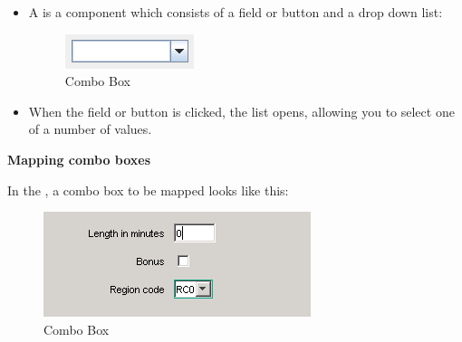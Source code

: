 \begin{itemize}
\item A  is a component which consists of a field or button and a drop down list:

\begin{figure}
\begin{center}
\includegraphics{PS/Combobox}
\caption{Combo Box}
\label{Combobox}
\end{center}
\end{figure}


  \item When the field or button is clicked, the list opens, allowing you to select one of a number of values.
\end{itemize}

\textbf{Mapping combo boxes}

In the \gdomm{}, a combo box to be mapped looks like this:

\begin{figure}
\begin{center}
\includegraphics{PS/Mapcombobox}
\caption{Combo Box}
\label{mapcombobox}
\end{center}
\end{figure}